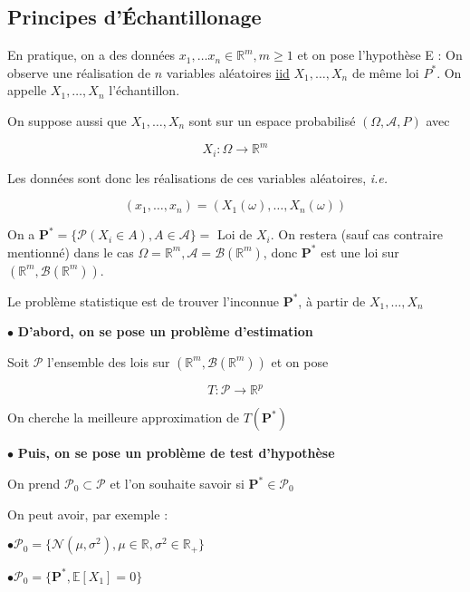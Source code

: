 \documentclass[12pt]{article}
\newcommand{\bb}[1]{\mathbb{#1}} %
\newcommand{\R}{\bb{R}} %
\renewcommand{\bf}[1]{\mathbf{#1}}
\newcommand{\ie}{\textit{i.e.}}
\renewcommand{\cal}{\mathcal}
\renewcommand{\bf}[1]{\mathbf{#1}}
\newcommand{\normale}[2]{\mathcal{N}(#1,#2)} %
\newcommand{\Xunan}{X_1,\ldots,X_n} %
\newcommand{\esp}[1]{\bb{ E} \mathopen{}\left[#1\right]} %
\newcommand{\OmegaAP}{(\Omega, \mathcal A, P)} %
\newcommand{\1}{\bb{1}} %
\begin{document}
\subsection{Principes d'Échantillonage}

En pratique, on a des données $x_1, \ldots x_n \in \R^m, m \ge 1$ et on pose l'hypothèse E : On observe une réalisation de $n$ variables aléatoires \underline{iid} $\Xunan$ de même loi $P^*$. On appelle $\Xunan$ l'échantillon.

On suppose aussi que $\Xunan$ sont sur un espace probabilisé $\OmegaAP$ avec 

$$X_i : \Omega \to \R^m$$

Les données sont donc les réalisations de ces variables aléatoires, \ie

$$(x_1, \ldots, x_n) = (X_1(\omega), \ldots, X_n(\omega))$$ 

On a $\bf P^*=\{ \cal P(X_i \in A), A \in \cal A\}=$ Loi de $X_i$. On restera (sauf cas contraire mentionné) dans le cas $\Omega =  \R^m, \cal A = \cal B(\R^m)$, donc $\bf P^*$ est une loi sur $(\R^m, \cal B(\R^m))$. 

Le problème statistique est de trouver l'inconnue $\bf P^*$, à partir de $\Xunan$

\vspace{1.5em}

$\bullet$ \textbf{D'abord, on se pose un problème d'estimation}\vspace{1.5em}

Soit $\mathscr{P}$ l'ensemble des lois sur $(\R^m, \cal B(\R^m))$ et on pose 

$$T : \mathscr{P} \to \R^p$$

On cherche la meilleure approximation de $T(\bf P^*)$


\vspace{1.5em}

$\bullet$ \textbf{Puis, on se pose un problème de test d'hypothèse}\vspace{1.5em}

On prend $\mathscr{P}_0 \subset \mathscr{P}$ et l'on souhaite savoir si $\bf P^* \in \mathscr{P}_0$

On peut avoir, par exemple :\vspace{1em}

\hspace{1.5em}$\bullet \mathscr{P}_0 = \{ \normale{\mu}{\sigma^2}, \mu \in \R, \sigma^2 \in \R_+ \}$

\hspace{1.5em}$\bullet \mathscr{P}_0=\{ \bf P^*, \esp{X_1} = 0\}$
\end{document}
